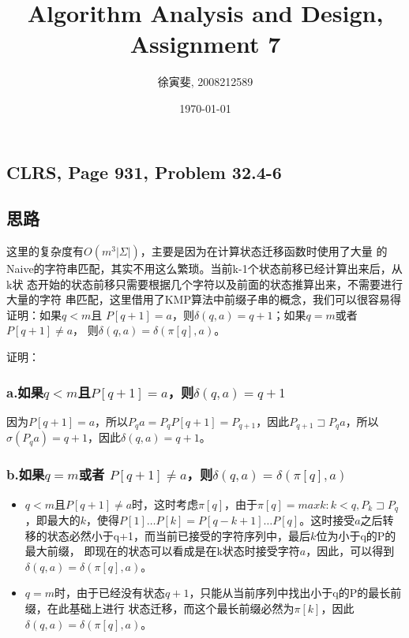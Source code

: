 \documentclass{article}
\begin{document}
\begin{CJK}{UTF8}{gbsn}
\title{Algorithm Analysis and Design, Assignment 7}
\author{徐寅斐, 2008212589}
\date{\today}

\maketitle

\section{CLRS, Page 931, Problem 32.4-6}

\subsection*{思路}

这里的复杂度有$O(m^3|\Sigma|)$，主要是因为在计算状态迁移函数时使用了大量
的Naive的字符串匹配，其实不用这么繁琐。当前k-1个状态前移已经计算出来后，从k状
态开始的状态前移只需要根据几个字符以及前面的状态推算出来，不需要进行大量的字符
串匹配，这里借用了KMP算法中前缀子串的概念，我们可以很容易得证明：如果$q <m$且
$P[q+1] = a$，则$\delta(q,a) = q+1$；如果$q = m$或者 $P[q+1]\neq a$，
则$\delta(q,a) = \delta(\pi[q],a)$。\newline\newline

证明：
\subsubsection*{a.如果$q <m$且$P[q+1] = a$，则$\delta(q,a) = q+1$}
因为$P[q+1] = a$，所以$P_qa = P_qP[q+1] = P_{q+1}$，因此$P_{q+1} \sqsupset
P_qa$，所以$\sigma(P_qa) = q+1$，因此$\delta(q,a) = q+1$。

\subsubsection*{b.如果$q = m$或者 $P[q+1]\neq a$，则$\delta(q,a) = \delta(\pi[q],a)$}
\begin{itemize}
  \item $q<m$且$P[q+1]\neq a$时，这时考虑$\pi[q]$，由于$\pi[q] = max{k: k<q,P_k
  \sqsupset P_q}$，即最大的$k$，使得$P[1]\ldots P[k] = P[q-k+1]\ldots
  P[q]$。这时接受$a$之后转移的状态必然小于q+1，而当前已接受的字符序列中，最后$k$位为小于q的P的最大前缀，
  即现在的状态可以看成是在k状态时接受字符$a$，因此，可以得到$\delta(q,a) = \delta(\pi[q],a)$。
  \item $q=m$时，由于已经没有状态$q+1$，只能从当前序列中找出小于q的P的最长前缀，在此基础上进行
  状态迁移，而这个最长前缀必然为$\pi[k]$，因此$\delta(q,a) = \delta(\pi[q],a)$。
\end{itemize}


\end{CJK}
\end{document}
